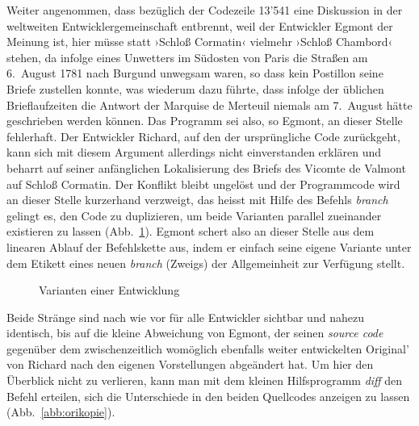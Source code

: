 \documentclass[a4paper,11pt]{article}
\newcommand{\inanf}[1]{›#1‹}
\begin{document}
Weiter angenommen, dass bezüglich der Codezeile 13'541 eine Diskussion in der weltweiten Entwicklergemeinschaft entbrennt, weil der Entwickler {\color{hokkaido}Egmont} der Meinung ist, hier müsse statt \inanf{Schloß Cormatin} vielmehr \inanf{Schloß Chambord} stehen, da infolge eines Unwetters im Südosten von Paris die Straßen am 6.~August 1781 nach Burgund unwegsam waren, so dass kein Postillon seine Briefe zustellen konnte, was wiederum dazu führte, dass infolge der üblichen Brieflaufzeiten die Antwort der Marquise de Merteuil niemals am 7.~August hätte geschrieben werden können. Das Programm sei also, so {\color{hokkaido}Egmont}, an dieser Stelle fehlerhaft. Der Entwickler {\color{dzug}Richard}, auf den der ursprüngliche Code zurückgeht, kann sich mit diesem Argument allerdings nicht einverstanden erklären und beharrt auf seiner anfänglichen Lokalisierung des Briefs des Vicomte de Valmont auf Schloß Cormatin. Der Konflikt bleibt ungelöst und der Programmcode wird an dieser Stelle kurzerhand verzweigt, das heisst mit Hilfe des Befehls \emph{branch} gelingt es, den Code zu duplizieren, um beide Varianten parallel zueinander existieren zu lassen (Abb.~\ref{abb:ori}). {\color{hokkaido}Egmont} schert also an dieser Stelle aus dem linearen Ablauf der Befehlskette aus, indem er einfach seine eigene Variante unter dem Etikett eines neuen \emph{branch} (Zweigs) der Allgemeinheit zur Verfügung stellt.

\begin{figure}[hpt]
\begin{center}
\end{center}
\caption{Varianten einer Entwicklung}\label{abb:ori}
\end{figure}

Beide Stränge sind nach wie vor für alle Entwickler sichtbar und nahezu identisch, bis auf die kleine Abweichung von {\color{hokkaido}Egmont}, der seinen \emph{source code} gegenüber dem zwischenzeitlich womöglich ebenfalls weiter entwickelten Original' von {\color{dzug}Richard} nach den eigenen Vorstellungen abgeändert hat. Um hier den Überblick nicht zu verlieren, kann man mit dem kleinen Hilfsprogramm \emph{diff} den Befehl erteilen, sich die Unterschiede in den beiden Quellcodes anzeigen zu lassen (Abb.~\ref{abb:orikopie}).
\end{document}
